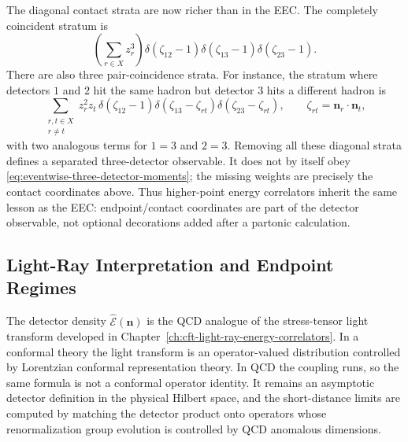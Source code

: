 The diagonal contact strata are now richer than in the EEC.  The completely
coincident stratum is
\begin{equation}
  \left(\sum_{r\in X}z_r^3\right)
  \delta(\zeta_{12}-1)\delta(\zeta_{13}-1)\delta(\zeta_{23}-1).
  \label{eq:eventwise-three-detector-total-contact}
\end{equation}
There are also three pair-coincidence strata.  For instance, the stratum
where detectors \(1\) and \(2\) hit the same hadron but detector \(3\) hits a
different hadron is
\begin{equation}
  \sum_{\substack{r,t\in X\\ r\neq t}}
  z_r^2z_t\,
  \delta(\zeta_{12}-1)
  \delta(\zeta_{13}-\zeta_{rt})
  \delta(\zeta_{23}-\zeta_{rt}),
  \qquad
  \zeta_{rt}=\mathbf n_r\cdot\mathbf n_t,
  \label{eq:eventwise-three-detector-pair-contact}
\end{equation}
with two analogous terms for \(1=3\) and \(2=3\).  Removing all these
diagonal strata defines a separated three-detector observable.  It does not
by itself obey \eqref{eq:eventwise-three-detector-moments}; the missing
weights are precisely the contact coordinates above.  Thus higher-point
energy correlators inherit the same lesson as the EEC: endpoint/contact
coordinates are part of the detector observable, not optional decorations
added after a partonic calculation.

\subsection{Light-Ray Interpretation and Endpoint Regimes}

The detector density \(\widehat{\mathcal E}(\mathbf n)\) is the QCD analogue
of the stress-tensor light transform developed in
Chapter~\ref{ch:cft-light-ray-energy-correlators}.  In a conformal theory the
light transform is an operator-valued distribution controlled by Lorentzian
conformal representation theory.  In QCD the coupling runs, so the same
formula is not a conformal operator identity.  It remains an asymptotic
detector definition in the physical Hilbert space, and the short-distance
limits are computed by matching the detector product onto operators whose
renormalization group evolution is controlled by QCD anomalous dimensions.

